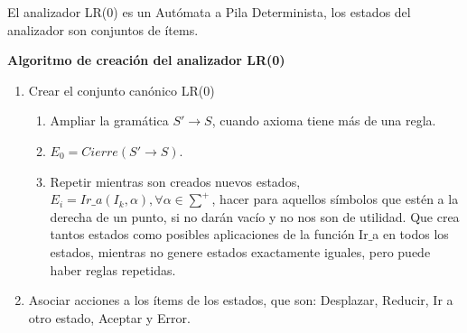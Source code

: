 \documentclass[12pt]{report} %
\begin{document}
El analizador LR(0) es un Autómata a Pila Determinista, los estados del analizador son conjuntos de ítems.

\textbf{Algoritmo de creación del analizador LR(0)}
\begin{enumerate}
  \item Crear el conjunto canónico LR(0)
  \begin{enumerate}
    \item Ampliar la gramática $S'\rightarrow S$, cuando axioma tiene más de una regla.
    \item $E_0 = Cierre(S'\rightarrow S)$.
    \item Repetir mientras son creados nuevos estados, $E_i = Ir\_a(I_k, \alpha), \forall \alpha \in \sum^+$, hacer para aquellos símbolos que estén a la derecha de un punto, si no darán vacío y no nos son de utilidad. Que crea tantos estados como posibles aplicaciones de la función Ir$\_$a en todos los estados, mientras no genere estados exactamente iguales, pero puede haber reglas repetidas.
  \end{enumerate}
  \item Asociar acciones a los ítems de los estados, que son: Desplazar, Reducir, Ir a otro estado, Aceptar y Error.
\end{enumerate}
\end{document}
